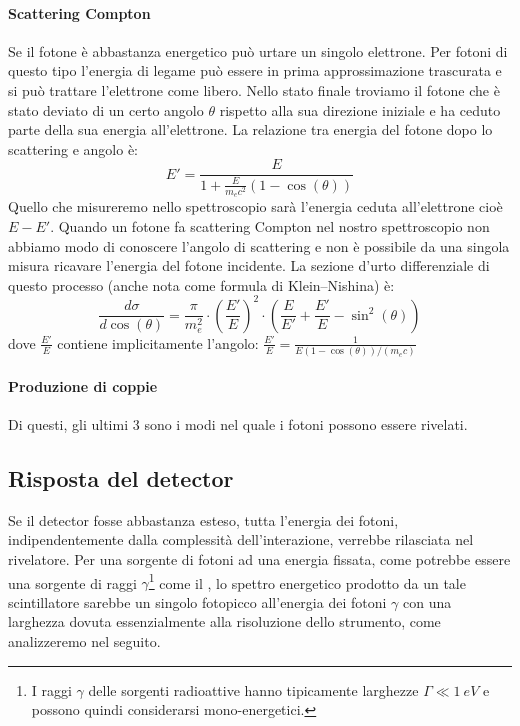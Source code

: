  \paragraph{Scattering Compton}
 Se il fotone è abbastanza energetico può urtare un singolo elettrone. Per fotoni di questo tipo l'energia di legame può essere in prima approssimazione trascurata e si può trattare l'elettrone come libero. Nello stato finale troviamo il fotone che è stato deviato di un certo angolo $\theta$ rispetto alla sua direzione iniziale e ha ceduto parte della sua energia all'elettrone. La relazione tra energia del fotone dopo lo scattering e angolo è:
 \begin{equation}
 \label{energia_compton}
 E' = \frac{E}{1+\frac{E}{m_ec^2}(1-\cos(\theta))}   
 \end{equation}
 Quello che misureremo nello spettroscopio sarà l'energia ceduta all'elettrone cioè $E-E'$. Quando un fotone fa scattering Compton nel nostro spettroscopio non abbiamo modo di conoscere l'angolo di scattering e non è possibile da una singola misura ricavare l'energia del fotone incidente.
 La sezione d'urto differenziale di questo processo (anche nota come formula di Klein–Nishina) è:
 \begin{equation}
 \label{klein-nishina}
 \frac{d\sigma}{d\cos(\theta)} = \frac{\pi}{m_e^2} \cdot\left(\frac{E'}{E}\right)^2 \cdot \left(\frac{E}{E'} + \frac{E'}{E} - \sin^2(\theta)\right)
 \end{equation}
 dove $\frac{E'}{E}$ contiene implicitamente l'angolo: $\frac{E'}{E} = \frac{1}{E(1-\cos(\theta))/(m_ec)}$
 
 \paragraph{Produzione di coppie}
 
 
 Di questi, gli ultimi 3 sono i modi nel quale i fotoni possono essere rivelati.
  
 \subsection{Risposta del detector}
 Se il detector fosse abbastanza esteso, tutta l'energia dei fotoni, indipendentemente dalla complessità dell'interazione, verrebbe rilasciata nel rivelatore. Per una sorgente di fotoni ad una energia fissata, come potrebbe essere una sorgente di raggi $\gamma$\footnote{I raggi $\gamma$ delle sorgenti radioattive hanno tipicamente larghezze $\Gamma \ll \SI{1}{eV}$ e possono quindi considerarsi mono-energetici.} come il \cs, lo spettro energetico prodotto da un tale scintillatore sarebbe un singolo fotopicco all'energia dei fotoni $\gamma$ con una larghezza dovuta essenzialmente alla risoluzione dello strumento, come analizzeremo nel seguito.
 
